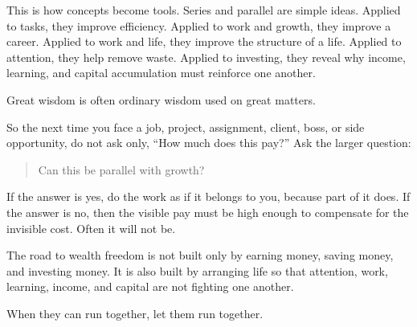 This is how concepts become tools. Series and parallel are simple ideas. Applied to tasks, they improve efficiency. Applied to work and growth, they improve a career. Applied to work and life, they improve the structure of a life. Applied to attention, they help remove waste. Applied to investing, they reveal why income, learning, and capital accumulation must reinforce one another.

Great wisdom is often ordinary wisdom used on great matters.

So the next time you face a job, project, assignment, client, boss, or side opportunity, do not ask only, ``How much does this pay?'' Ask the larger question:

\begin{quote}
Can this be parallel with growth?
\end{quote}

If the answer is yes, do the work as if it belongs to you, because part of it does. If the answer is no, then the visible pay must be high enough to compensate for the invisible cost. Often it will not be.

The road to wealth freedom is not built only by earning money, saving money, and investing money. It is also built by arranging life so that attention, work, learning, income, and capital are not fighting one another.

When they can run together, let them run together.
